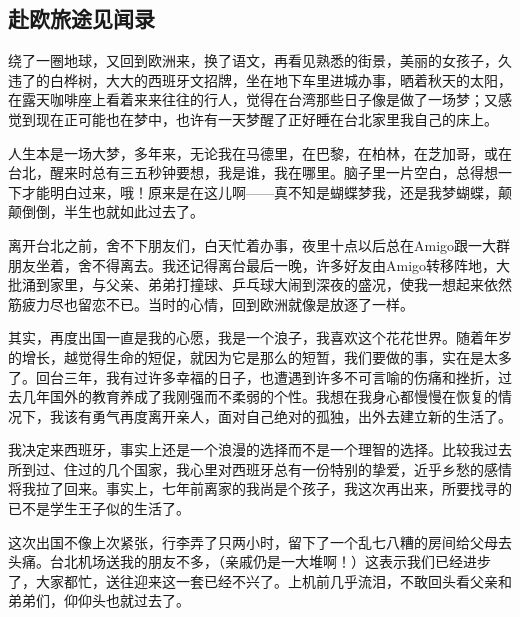 \subsection{赴欧旅途见闻录}

\par 绕了一圈地球，又回到欧洲来，换了语文，再看见熟悉的街景，美丽的女孩子，久违了的白桦树，大大的西班牙文招牌，坐在地下车里进城办事，晒着秋天的太阳，在露天咖啡座上看着来来往往的行人，觉得在台湾那些日子像是做了一场梦；又感觉到现在正可能也在梦中，也许有一天梦醒了正好睡在台北家里我自己的床上。
\par 人生本是一场大梦，多年来，无论我在马德里，在巴黎，在柏林，在芝加哥，或在台北，醒来时总有三五秒钟要想，我是谁，我在哪里。脑子里一片空白，总得想一下才能明白过来，哦！原来是在这儿啊——真不知是蝴蝶梦我，还是我梦蝴蝶，颠颠倒倒，半生也就如此过去了。
\par 离开台北之前，舍不下朋友们，白天忙着办事，夜里十点以后总在Amigo跟一大群朋友坐着，舍不得离去。我还记得离台最后一晚，许多好友由Amigo转移阵地，大批涌到家里，与父亲、弟弟打撞球、乒乓球大闹到深夜的盛况，使我一想起来依然筋疲力尽也留恋不已。当时的心情，回到欧洲就像是放逐了一样。
\par 其实，再度出国一直是我的心愿，我是一个浪子，我喜欢这个花花世界。随着年岁的增长，越觉得生命的短促，就因为它是那么的短暂，我们要做的事，实在是太多了。回台三年，我有过许多幸福的日子，也遭遇到许多不可言喻的伤痛和挫折，过去几年国外的教育养成了我刚强而不柔弱的个性。我想在我身心都慢慢在恢复的情况下，我该有勇气再度离开亲人，面对自己绝对的孤独，出外去建立新的生活了。
\par 我决定来西班牙，事实上还是一个浪漫的选择而不是一个理智的选择。比较我过去所到过、住过的几个国家，我心里对西班牙总有一份特别的挚爱，近乎乡愁的感情将我拉了回来。事实上，七年前离家的我尚是个孩子，我这次再出来，所要找寻的已不是学生王子似的生活了。
\par 这次出国不像上次紧张，行李弄了只两小时，留下了一个乱七八糟的房间给父母去头痛。台北机场送我的朋友不多，（亲戚仍是一大堆啊！）这表示我们已经进步了，大家都忙，送往迎来这一套已经不兴了。上机前几乎流泪，不敢回头看父亲和弟弟们，仰仰头也就过去了。
